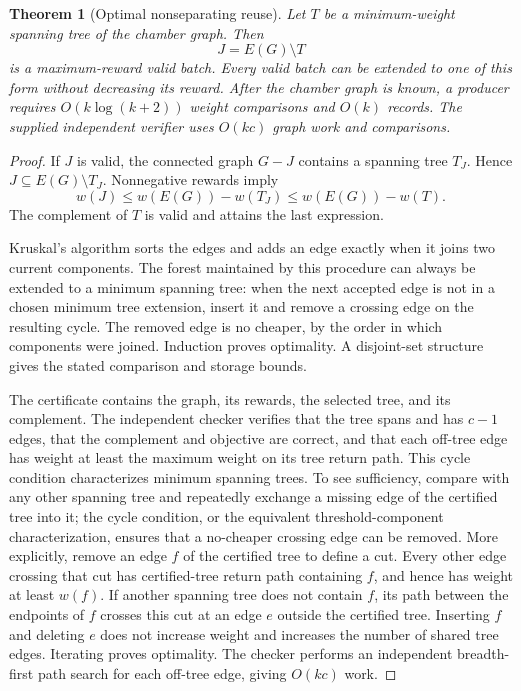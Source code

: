 \documentclass[11pt]{article}
\newtheorem{theorem}{Theorem}[section]
\theoremstyle{definition}
\begin{document}
\begin{theorem}[Optimal nonseparating reuse]\label{thm:mst}
Let $T$ be a minimum-weight spanning tree of the chamber graph. Then
\[
 J=E(G)\setminus T
\]
is a maximum-reward valid batch. Every valid batch can be extended to one of this form without decreasing its reward. After the chamber graph is known, a producer requires $O(k\log(k+2))$ weight comparisons and $O(k)$ records. The supplied independent verifier uses $O(kc)$ graph work and comparisons.
\end{theorem}
\begin{proof}
If $J$ is valid, the connected graph $G-J$ contains a spanning tree $T_J$. Hence $J\subseteq E(G)\setminus T_J$. Nonnegative rewards imply
\[
 w(J)\leq w(E(G))-w(T_J)\leq w(E(G))-w(T).
\]
The complement of $T$ is valid and attains the last expression.

Kruskal's algorithm sorts the edges and adds an edge exactly when it joins two current components. The forest maintained by this procedure can always be extended to a minimum spanning tree: when the next accepted edge is not in a chosen minimum tree extension, insert it and remove a crossing edge on the resulting cycle. The removed edge is no cheaper, by the order in which components were joined. Induction proves optimality. A disjoint-set structure gives the stated comparison and storage bounds.

The certificate contains the graph, its rewards, the selected tree, and its complement. The independent checker verifies that the tree spans and has $c-1$ edges, that the complement and objective are correct, and that each off-tree edge has weight at least the maximum weight on its tree return path. This cycle condition characterizes minimum spanning trees. To see sufficiency, compare with any other spanning tree and repeatedly exchange a missing edge of the certified tree into it; the cycle condition, or the equivalent threshold-component characterization, ensures that a no-cheaper crossing edge can be removed. More explicitly, remove an edge $f$ of the certified tree to define a cut. Every other edge crossing that cut has certified-tree return path containing $f$, and hence has weight at least $w(f)$. If another spanning tree does not contain $f$, its path between the endpoints of $f$ crosses this cut at an edge $e$ outside the certified tree. Inserting $f$ and deleting $e$ does not increase weight and increases the number of shared tree edges. Iterating proves optimality. The checker performs an independent breadth-first path search for each off-tree edge, giving $O(kc)$ work.
\end{proof}
\end{document}
